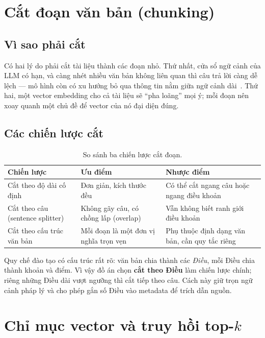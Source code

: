 \section{Cắt đoạn văn bản (chunking)}

\subsection{Vì sao phải cắt}

Có hai lý do phải cắt tài liệu thành các đoạn nhỏ. Thứ nhất, cửa sổ ngữ cảnh của LLM có hạn, và càng nhét nhiều văn bản không liên quan thì câu trả lời càng dễ lệch --- mô hình còn có xu hướng bỏ qua thông tin nằm giữa ngữ cảnh dài~\cite{liu2023lostinthemiddle}. Thứ hai, một vector embedding cho cả tài liệu sẽ ``pha loãng'' mọi ý; mỗi đoạn nên xoay quanh một chủ đề để vector của nó đại diện đúng.

\subsection{Các chiến lược cắt}

\begin{table}[H]
  \centering
  \small
  \begin{tabularx}{\textwidth}{l X X}
    \toprule
    \textbf{Chiến lược} & \textbf{Ưu điểm} & \textbf{Nhược điểm} \\
    \midrule
    Cắt theo độ dài cố định & Đơn giản, kích thước đều & Có thể cắt ngang câu hoặc ngang điều khoản \\
    Cắt theo câu (sentence splitter) & Không gãy câu, có chồng lấp (overlap) & Vẫn không biết ranh giới điều khoản \\
    Cắt theo cấu trúc văn bản & Mỗi đoạn là một đơn vị nghĩa trọn vẹn & Phụ thuộc định dạng văn bản, cần quy tắc riêng \\
    \bottomrule
  \end{tabularx}
  \caption{So sánh ba chiến lược cắt đoạn.}
\end{table}

Quy chế đào tạo có cấu trúc rất rõ: văn bản chia thành các \emph{Điều}, mỗi Điều chia thành khoản và điểm. Vì vậy đồ án chọn \textbf{cắt theo Điều} làm chiến lược chính; riêng những Điều dài vượt ngưỡng thì cắt tiếp theo câu. Cách này giữ trọn ngữ cảnh pháp lý và cho phép gắn số Điều vào metadata để trích dẫn nguồn.

\section{Chỉ mục vector và truy hồi top-\texorpdfstring{$k$}{k}}

